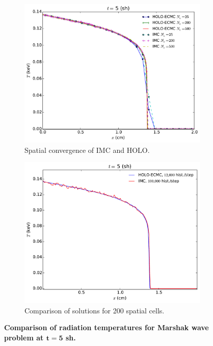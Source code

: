 \documentclass[11pt]{article}
\begin{document}
\begin{figure}[H]
    \centering
\begin{subfigure}{0.49\textwidth}
  \centering
    \includegraphics[width=0.99\linewidth]{marshak_mesh_conv.pdf}
    \caption{\label{marshak_mesh_conv} Spatial convergence of IMC and HOLO.}
\end{subfigure}
\begin{subfigure}{0.49\textwidth}
    \vspace{0.021in}
  \centering
  \includegraphics[width=0.99\linewidth]{marshak_200_compare.pdf}
  \caption{\label{marshak_200_compare}  Comparison of solutions for 200 spatial cells. }
\end{subfigure}
\caption{\bf Comparison of radiation temperatures for Marshak wave problem at $\mathbf{t=5}$ sh.}
\end{figure}
\end{document}
